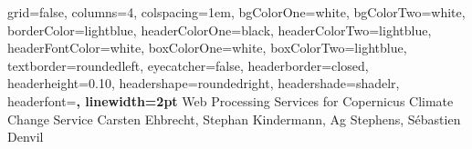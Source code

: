 \documentclass[landscape,a0paper,fontscale=0.4]{baposter} %
\begin{document}


\begin{poster}%
  {
  grid=false,
  columns=4,
  colspacing=1em,
  bgColorOne=white, %
  bgColorTwo=white, %
  borderColor=lightblue, %
  headerColorOne=black, %
  headerColorTwo=lightblue, %
  headerFontColor=white, %
  boxColorOne=white, %
  boxColorTwo=lightblue,
  textborder=roundedleft,
  eyecatcher=false, %
  headerborder=closed, %
  headerheight=0.10\textheight, %
  headershape=roundedright, %
  headershade=shadelr,
  headerfont=\Large\bf\textsf, %
  linewidth=2pt
  }
  {} %
  {\sf %
  Web Processing Services for Copernicus Climate Change Service
  }
  {\sf %
    Carsten Ehbrecht\footnotemark[1], Stephan Kindermann\footnotemark[1], Ag Stephens\footnotemark[2], Sébastien Denvil\footnotemark[3]\\
}
\end{poster}
\end{document}

